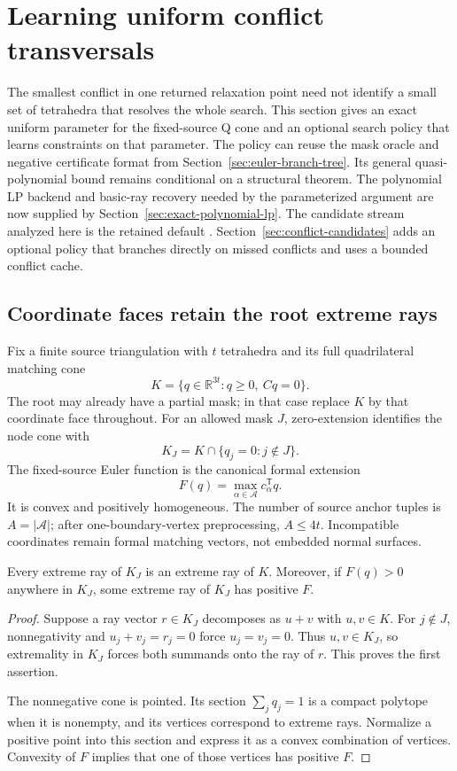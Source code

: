 \section{Learning uniform conflict transversals}
\label{sec:euler-transversal}

The smallest conflict in one returned relaxation point need not identify a
small set of tetrahedra that resolves the whole search.  This section gives
an exact uniform parameter for the fixed-source Q cone and an optional
search policy that learns constraints on that parameter.  The policy can
reuse the mask oracle and negative certificate format from
Section~\ref{sec:euler-branch-tree}.  Its general quasi-polynomial bound
remains conditional on a structural theorem.  The polynomial LP backend
and basic-ray recovery needed by the parameterized argument are now supplied
by Section~\ref{sec:exact-polynomial-lp}.
The candidate stream analyzed here is the retained default
.  Section~\ref{sec:conflict-candidates}
adds an optional policy that branches directly on missed conflicts and
uses a bounded conflict cache.

\subsection{Coordinate faces retain the root extreme rays}

Fix a finite source triangulation with $t$ tetrahedra and its full
quadrilateral matching cone
\[
 K=\{q\in\mathbb R^{3t}:q\ge0,\ Cq=0\}.
\]
The root may already have a partial mask; in that case replace $K$ by
that coordinate face throughout.  For an allowed mask $J$, zero-extension
identifies the node cone with
\[
 K_J=K\cap\{q_j=0:j\notin J\}.
\]
The fixed-source Euler function is the canonical formal extension
\[
 F(q)=\max_{\alpha\in\mathcal A}c_\alpha^{\mathsf T}q.
\]
It is convex and positively homogeneous.  The number of source anchor
tuples is $A=|\mathcal A|$; after one-boundary-vertex preprocessing,
$A\le4t$.  Incompatible coordinates remain formal matching vectors, not
embedded normal surfaces.

\begin{lemma}
\label{lem:transversal-face-rays}
Every extreme ray of $K_J$ is an extreme ray of $K$.  Moreover, if
$F(q)>0$ anywhere in $K_J$, some extreme ray of $K_J$ has positive $F$.
\end{lemma}
\begin{proof}
Suppose a ray vector $r\in K_J$ decomposes as $u+v$ with $u,v\in K$.
For $j\notin J$, nonnegativity and $u_j+v_j=r_j=0$ force
$u_j=v_j=0$.  Thus $u,v\in K_J$, so extremality in $K_J$ forces both
summands onto the ray of $r$.  This proves the first assertion.

The nonnegative cone is pointed.  Its section $\sum_jq_j=1$ is a
compact polytope when it is nonempty, and its vertices correspond to
extreme rays.  Normalize a positive point into this section and express
it as a convex combination of vertices.  Convexity of $F$ implies that
one of those vertices has positive $F$.
\end{proof}

